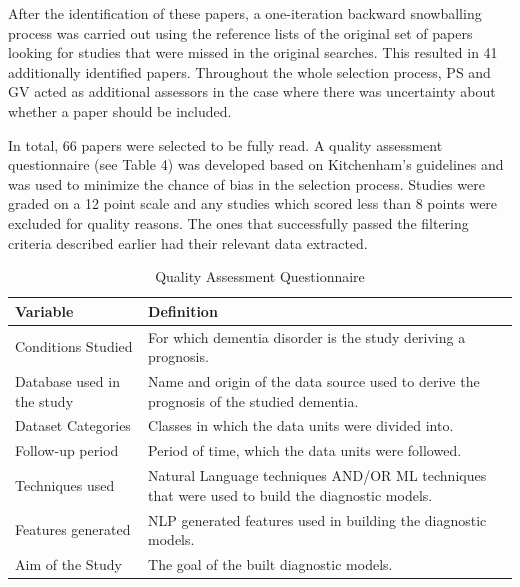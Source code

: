 \documentclass[10pt, letterpaper, twoside, openany]{thesis}
\begin{document}
After the identification of these papers, a one-iteration backward snowballing process was carried out using the reference lists of the original set of papers looking for studies that were missed in the original searches. This resulted in 41 additionally identified papers. Throughout the whole selection process, PS and GV acted as additional assessors in the case where there was uncertainty about whether a paper should be included.
\par 
In total, 66 papers were selected to be fully read. A quality assessment questionnaire (see Table 4) was developed based on Kitchenham's guidelines and was used to minimize the chance of bias in the selection process. Studies were graded on a 12 point scale and any studies which scored less than 8 points were excluded for quality reasons. The ones that successfully passed the filtering criteria described earlier had their relevant data extracted. 

\begin{table}[H]
	\begin{center}
	\begin{tabular}{ | p{6cm} | p{6cm} | }
	\hline
	Variable & Definition \\ \hline
	Conditions Studied & For which dementia disorder is the study deriving a prognosis. \\ \hline
	Database used in the study & Name and origin of the data source used to derive the prognosis of the studied dementia. \\ \hline
	Dataset Categories & Classes in which the data units were divided into. \\ \hline
	Follow-up period & Period of time, which the data units were followed. \\ \hline
	Techniques used & Natural Language techniques AND/OR ML techniques that were used to build the diagnostic models. \\ \hline 
	Features generated & NLP generated features used in building the diagnostic models. \\ \hline
	Aim of the Study & The goal of the built diagnostic models. \\
	\hline 
	\end{tabular}
	\caption[Table caption text]{Quality Assessment Questionnaire}
	\label{table:name}
	\end{center}
\end{table}
\end{document}

